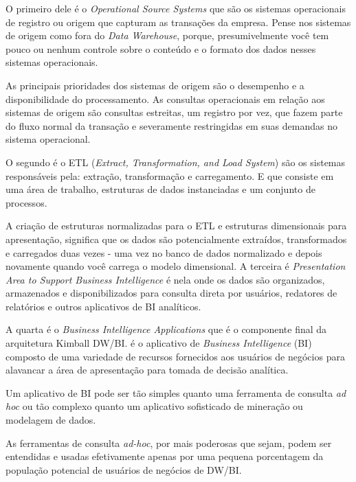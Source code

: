 O primeiro dele \'{e} o \textit{Operational Source Systems} que s\~{a}o os sistemas operacionais de registro ou origem que capturam as transa\c{c}\~{o}es da empresa. Pense nos sistemas de origem como fora do \textit{Data Warehouse}, porque, presumivelmente voc\^{e} tem pouco ou nenhum controle sobre o conteúdo e o formato dos dados nesses sistemas operacionais. 

As principais prioridades dos sistemas de origem s\~{a}o o desempenho e a disponibilidade do processamento. As consultas operacionais em rela\c{c}\~{a}o aos sistemas de origem s\~{a}o consultas estreitas, um registro por vez, que fazem parte do fluxo normal da transa\c{c}\~{a}o e severamente restringidas em suas demandas no sistema operacional.

O segundo \'{e} o ETL (\textit{Extract, Transformation, and Load System}) s\~{a}o os sistemas respons\'{a}veis pela: extra\c{c}\~{a}o, transforma\c{c}\~{a}o e carregamento. E que consiste em uma \'{a}rea de trabalho, estruturas de dados instanciadas e um conjunto de processos.

A cria\c{c}\~{a}o de estruturas normalizadas para o ETL e estruturas dimensionais para apresenta\c{c}\~{a}o, significa que os dados s\~{a}o potencialmente extra\'{i}dos, transformados e carregados duas vezes - uma vez no banco de dados normalizado e depois novamente quando voc\^{e} carrega o modelo dimensional. 
A terceira \'{e} \textit{Presentation Area to Support Business Intelligence} \'{e} nela onde os dados s\~{a}o organizados, armazenados e disponibilizados para consulta direta por usu\'{a}rios, redatores de relat\'{o}rios e outros aplicativos de BI anal\'{i}ticos.

A quarta \'{e} o \textit{Business Intelligence Applications} que \'{e} o componente final da arquitetura Kimball DW/BI. \'{e} o aplicativo de \textit{Business Intelligence} (BI) composto de uma variedade de recursos fornecidos aos usu\'{a}rios de neg\'{o}cios para alavancar a \'{a}rea de apresenta\c{c}\~{a}o para tomada de decis\~{a}o anal\'{i}tica.

Um aplicativo de BI pode ser t\~{a}o simples quanto uma ferramenta de consulta \textit{ad hoc} ou t\~{a}o complexo quanto um aplicativo sofisticado de minera\c{c}\~{a}o ou modelagem de dados. 

As ferramentas de consulta \textit{ad-hoc}, por mais poderosas que sejam, podem ser entendidas e usadas efetivamente apenas por uma pequena porcentagem da popula\c{c}\~{a}o potencial de usu\'{a}rios de neg\'{o}cios de DW/BI. 

